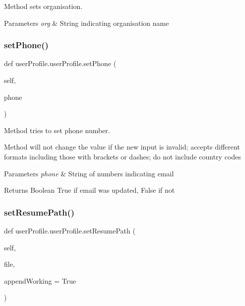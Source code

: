 Method sets organisation. 


\begin{DoxyParams}{Parameters}
{\em org} & String indicating organisation name \\
\hline
\end{DoxyParams}
\mbox{\label{classuserProfile_1_1userProfile_af57b152c37a8ce53368166751893e0b3}} 
\subsubsection{\texorpdfstring{set\+Phone()}{setPhone()}}
{\footnotesize\ttfamily def user\+Profile.\+user\+Profile.\+set\+Phone (\begin{DoxyParamCaption}\item[{}]{self,  }\item[{}]{phone }\end{DoxyParamCaption})}



Method tries to set phone number. 

Method will not change the value if the new input is invalid; accepts different formats including those with brackets or dashes; do not include country codes 
\begin{DoxyParams}{Parameters}
{\em phone} & String of numbers indicating email \\
\hline
\end{DoxyParams}
\begin{DoxyReturn}{Returns}
Boolean True if email was updated, False if not 
\end{DoxyReturn}
\mbox{\label{classuserProfile_1_1userProfile_ae7ad036942595e2ae9c1247d2c49a63b}} 
\subsubsection{\texorpdfstring{set\+Resume\+Path()}{setResumePath()}}
{\footnotesize\ttfamily def user\+Profile.\+user\+Profile.\+set\+Resume\+Path (\begin{DoxyParamCaption}\item[{}]{self,  }\item[{}]{file,  }\item[{}]{append\+Working = {\ttfamily True} }\end{DoxyParamCaption})}




